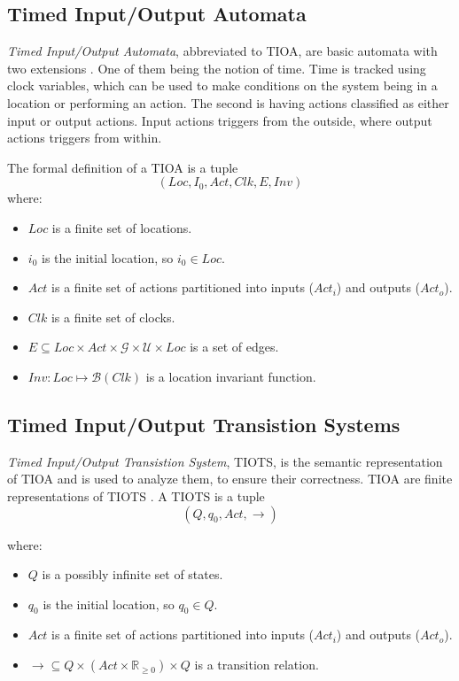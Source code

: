 \subsection{Timed Input/Output Automata}\label{sec:TIOA}
\emph{Timed Input/Output Automata}, abbreviated to TIOA, are basic automata with two extensions \cite{ecdartheory}. One of them being the notion of time. Time is tracked using clock variables, which can be used to make conditions on the system being in a location or performing an action. The second is having actions classified as either input or output actions. Input actions triggers from the outside, where output actions triggers from within. 

The formal definition of a TIOA is a tuple \cite{ecdartheory} $$(Loc, I_{0}, Act, Clk, E, Inv)$$  
where:

\begin{itemize}
    \item $Loc$ is a finite set of locations.
    \item $i_{0}$ is the initial location, so $i_{0} \in Loc$.
    \item $Act$ is a finite set of actions partitioned into inputs ($Act_{i}$) and outputs ($Act_{o}$).
    \item $Clk$ is a finite set of clocks.
    \item $E \subseteq Loc \times Act \times \mathcal{G} \times \mathcal{U} \times Loc$ is a set of edges.
    \item $Inv : Loc \mapsto \mathcal{B}(Clk)$ is a location invariant function. 
\end{itemize}

\subsection{Timed Input/Output Transistion Systems}\label{sec:TIOTS}

\emph{Timed Input/Output Transistion System}, TIOTS, is the semantic representation of TIOA and is used to analyze them, to ensure their correctness. TIOA are finite representations of TIOTS \cite{}. A TIOTS is a tuple \cite{}  $$(Q, q_{0}, Act, \rightarrow)$$

where:

\begin{itemize}
    \item $Q$ is a possibly infinite set of states.
    \item $q_{0}$ is the initial location, so $q_{0} \in Q$.
    \item $Act$ is a finite set of actions partitioned into inputs ($Act_{i}$) and outputs ($Act_{o}$).
    \item $\rightarrow \subseteq Q \times (Act \times \mathbb{R}_{\geq 0}) \times Q$ is a transition relation.
\end{itemize}

